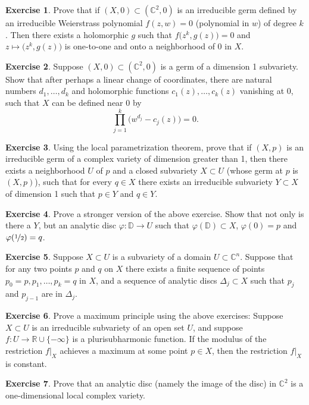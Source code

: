 \documentclass[12pt,openany]{book}
\newcommand{\C}{{\mathbb{C}}}
\newcommand{\R}{{\mathbb{R}}}
\newcommand{\D}{{\mathbb{D}}}
\theoremstyle{plain}
\theoremstyle{remark}
\theoremstyle{definition}
\newenvironment{exbox}{%
    \def\FrameCommand{\vrule width 1pt \relax\hspace {10pt}}%
    \MakeFramed {\advance \hsize -\width \FrameRestore }%
}{%
    \endMakeFramed
}
\theoremstyle{exercise}
\newtheorem{exercise}{Exercise}[section]
\theoremstyle{example}
\begin{document}
\begin{exbox}
\begin{exercise}
Prove that if $(X,0) \subset (\C^2,0)$ is an irreducible germ defined
by an irreducible Weierstrass polynomial $f(z,w) = 0$ (polynomial in $w$)
of degree $k$.  Then there exists a holomorphic $g$ such that
$f\bigl(z^k,g(z)\bigr) = 0$ and $z \mapsto \bigl(z^k,g(z)\bigr)$
is one-to-one and onto a neighborhood of 0 in $X$.
\end{exercise}

\begin{exercise}
Suppose $(X,0) \subset (\C^2,0)$ is a germ of a dimension 1 subvariety.
Show that after perhaps a linear change of coordinates,
there are natural numbers
$d_1,\ldots,d_k$
and
holomorphic functions $c_1(z),\ldots,c_k(z)$ vanishing at $0$,
such that $X$ can be defined near 0 by
\begin{equation*}
\prod_{j=1}^k {\bigl( w^{d_j} - c_j(z) \bigr)} = 0.
\end{equation*}
\end{exercise}

\begin{exercise}
Using the local parametrization theorem, prove that
if $(X,p)$ is an irreducible germ of a complex variety of dimension greater
than 1, then there exists a neighborhood $U$ of $p$ and a closed subvariety
$X \subset U$ (whose germ at $p$ is $(X,p)$), such that for every
$q \in X$ there exists an irreducible subvariety $Y \subset X$
of dimension 1 such that $p \in Y$ and $q \in Y$.
\end{exercise}

\begin{exercise}
Prove a stronger version of the above exercise.  Show that not only is there
a $Y$, but an analytic disc $\varphi \colon \D \to U$ such that
$\varphi(\D) \subset X$, $\varphi(0) = p$ and $\varphi(\nicefrac{1}{2}) =
q$.
\end{exercise}

\begin{exercise}
Suppose $X \subset U$ is a subvariety of a domain $U \subset \C^n$.
Suppose that for any two points $p$ and $q$ on $X$ there exists a finite sequence
of points $p_0 = p, p_1, \ldots, p_k = q$ in $X$, and a sequence of analytic discs
$\Delta_j \subset X$ such that $p_{j}$ and $p_{j-1}$ are in $\Delta_j$.
\end{exercise}

\begin{exercise}
Prove a maximum principle using the above exercises:
Suppose $X \subset U$ is an irreducible subvariety of an open set $U$,
and suppose $f \colon U \to \R \cup \{ - \infty \}$
is a plurisubharmonic function.  If the modulus of the restriction $f|_X$
achieves a maximum
at some point $p \in X$, then the restriction $f|_X$ is constant.
\end{exercise}

\begin{exercise}
Prove that an analytic disc (namely the image of the disc) in $\C^2$
is a one-dimensional local complex variety.
\end{exercise}
\end{exbox}
\end{document}
